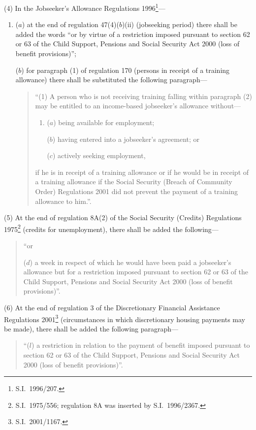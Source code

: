 \documentclass[12pt,a4paper]{article}
\begin{document}
(4) In the Jobseeker’s Allowance Regulations 1996\footnote{S.I.\ 1996/207.}—
\begin{enumerate}\item[]
($a$) at the end of regulation 47(4)($b$)(ii)  (jobseeking period) there shall be added the words “or by virtue of a restriction imposed pursuant to section 62 or 63 of the Child Support, Pensions and Social Security Act 2000 (loss of benefit provisions)”;

($b$) for paragraph (1) of regulation 170 (persons in receipt of a training allowance) there shall be substituted the following paragraph—
\begin{quotation}
“(1) A person who is not receiving training falling within paragraph (2) may be entitled to an income-based jobseeker’s allowance without—
\begin{enumerate}\item[]
($a$) being available for employment;

($b$) having entered into a jobseeker’s agreement; or

($c$) actively seeking employment,
\end{enumerate}
if he is in receipt of a training allowance or if he would be in receipt of a training allowance if the Social Security (Breach of Community Order) Regulations 2001 did not prevent the payment of a training allowance to him.”.
\end{quotation}
\end{enumerate}

(5) At the end of regulation 8A(2) of the Social Security (Credits) Regulations 1975\footnote{S.I.\ 1975/556; regulation 8A was inserted by S.I.\ 1996/2367.} (credits for unemployment), there shall be added the following—
\begin{quotation}
“or

($d$)  a week in respect of which he would have been paid a jobseeker’s allowance but for a restriction imposed pursuant to section 62 or 63 of the Child Support, Pensions and Social Security Act 2000 (loss of benefit provisions)”.
\end{quotation}

(6) At the end of regulation 3 of the Discretionary Financial Assistance Regulations 2001\footnote{S.I.\ 2001/1167.} (circumstances in which discretionary housing payments may be made), there shall be added the following paragraph—
\begin{quotation}
“($l$) a restriction in relation to the payment of benefit imposed pursuant to section 62 or 63 of the Child Support, Pensions and Social Security Act 2000 (loss of benefit provisions)”.
\end{quotation}
\end{document}
